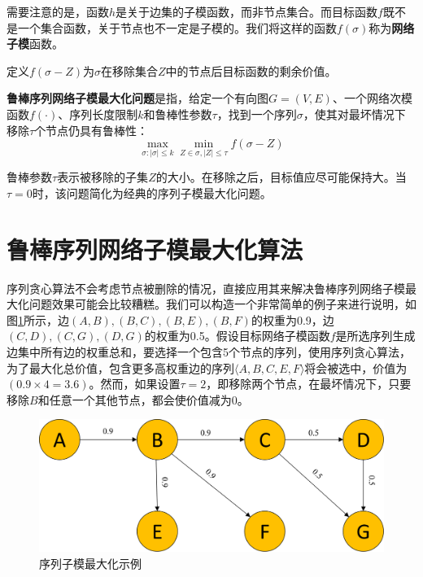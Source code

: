 需要注意的是，函数\(h\)是关于边集的子模函数，而非节点集合。而目标函数\(f\)既不是一个集合函数，关于节点也不一定是子模的。我们将这样的函数\(f(\sigma)\)称为{\bfseries 网络子模}函数。

定义\(f(\sigma - Z)\)为$\sigma$在移除集合\(Z\)中的节点后目标函数的剩余价值。
\begin{definition}
{\bfseries 鲁棒序列网络子模最大化问题}是指，给定一个有向图\(G=(V,E)\)、一个网络次模函数\(f(\cdot)\)、序列长度限制$k$和鲁棒性参数\(\tau\)，找到一个序列\(\sigma\)，使其对最坏情况下移除\(\tau\)个节点仍具有鲁棒性：
\begin{equation}
    \max_{\sigma:|\sigma|\le k} \min_{Z\in \sigma,|Z|\le \tau} f(\sigma - Z)
\end{equation}
\end{definition}

鲁棒参数\(\tau\)表示被移除的子集\(Z\)的大小。在移除之后，目标值应尽可能保持大。当\(\tau = 0\)时，该问题简化为经典的序列子模最大化问题\cite{mitrovic2018submodularity}。

\section{鲁棒序列网络子模最大化算法}

序列贪心算法\cite{mitrovic2018submodularity}不会考虑节点被删除的情况，直接应用其来解决鲁棒序列网络子模最大化问题效果可能会比较糟糕。我们可以构造一个非常简单的例子来进行说明，如图\ref{fig:rose_sample}所示，边$(A,B),(B,C),(B,E),(B,F)$的权重为0.9，边$(C,D),(C,G),(D,G)$的权重为0.5。假设目标网络子模函数\(f\)是所选序列生成边集中所有边的权重总和，要选择一个包含5个节点的序列，使用序列贪心算法，为了最大化总价值，包含更多高权重边的序列\(\langle A,B,C,E,F \rangle\)将会被选中，价值为\((0.9 \times 4 = 3.6)\)。然而，如果设置\(\tau=2\)，即移除两个节点，在最坏情况下，只要移除\(B\)和任意一个其他节点，都会使价值减为$0$。

\begin{figure}[th]
    \centering
    \includegraphics[width=.89\linewidth]{figure/rosenets/sample2}
    \caption{序列子模最大化示例}
    \label{fig:rose_sample}
\end{figure}

